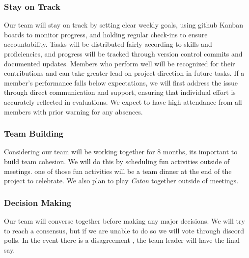 \documentclass{article}
\begin{document}
\subsubsection*{Stay on Track}

Our team will stay on track by setting clear weekly goals, 
using github Kanban boards to monitor progress, and 
holding regular check-ins to ensure accountability. Tasks 
will be distributed fairly according to skills and proficiencies, 
and progress will be tracked through version control commits and 
documented updates. Members who perform well will be recognized 
for their contributions and can take greater lead on project
direction in future tasks. If a member's performance 
falls below expectations, we will first address the issue 
through direct communication and support, ensuring that 
individual effort is accurately reflected in evaluations.
We expect to have high attendance from all members with prior 
warning for any absences.

\subsubsection*{Team Building}


\raggedright
Considering our team will be working together for 8 months, its important to build
team cohesion. We will do this by scheduling fun activities outside of meetings. one
of those fun activities will be a team dinner at the end of the project to celebrate.
We also plan to play \textit{Catan} together outside of meetings. 

\subsubsection*{Decision Making} 


\raggedright
Our team will converse together before making any major decisions. We will try to reach
a consensus, but if we are unable to do so we will vote through discord polls. In the event
there is a disagreement , the team leader will have the final say.
\end{document}
